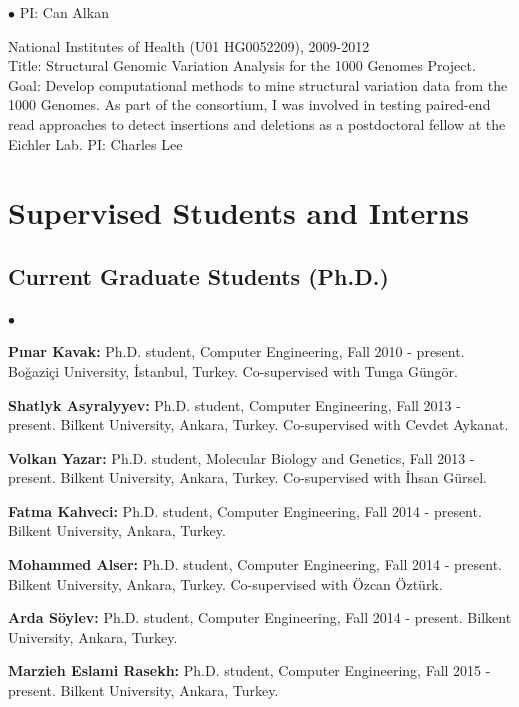 \documentclass[margin,line]{res}
\newenvironment{list2}{
  \begin{list}{$\bullet$}{%
      \setlength{\itemsep}{0in}
      \setlength{\parsep}{0in} \setlength{\parskip}{0in}
      \setlength{\topsep}{0in} \setlength{\partopsep}{0in} 
      \setlength{\leftmargin}{0.2in}}}{\end{list}}
\begin{document}
\begin{resume}
\begin{list2}
                                         PI: Can Alkan
                                       \item
                                         National Institutes of Health (U01 HG0052209), 2009-2012\\
                                         Title: Structural Genomic Variation Analysis for the 1000 Genomes Project.\\
                                         Goal: Develop computational methods to mine structural variation data from the 1000 Genomes.
                                         As part of the consortium, I was involved in testing paired-end read approaches to detect insertions and deletions as a postdoctoral fellow at the Eichler Lab.
                                         PI: Charles Lee
                                       \end{list2}


\section{\sc Supervised Students and Interns}
\vspace*{-.4cm}
\subsection{\small \sc Current Graduate Students (Ph.D.)}
\begin{list2}
\item
  {\bf P{\i}nar Kavak:} Ph.D. student, Computer Engineering, Fall 2010 - present.
  Bo\u{g}azi\c{c}i University, \.{I}stanbul, Turkey. Co-supervised with Tunga G\"{u}ng\"{o}r.
\item
  {\bf Shatlyk Asyralyyev:} Ph.D. student, Computer Engineering, Fall 2013 - present.
  Bilkent University, Ankara, Turkey. Co-supervised with Cevdet Aykanat.
\item
  {\bf Volkan Yazar:} Ph.D. student, Molecular Biology and Genetics, Fall 2013 - present.
  Bilkent University, Ankara, Turkey. Co-supervised with İhsan Gürsel.
\item
  {\bf Fatma Kahveci:} Ph.D. student, Computer Engineering, Fall 2014 - present.
  Bilkent University, Ankara, Turkey.
\item
  {\bf Mohammed Alser:} Ph.D. student, Computer Engineering, Fall 2014 - present.
  Bilkent University, Ankara, Turkey. Co-supervised with Özcan Öztürk.
\item
  {\bf Arda Söylev:} Ph.D. student, Computer Engineering, Fall 2014 - present.
  Bilkent University, Ankara, Turkey. 
\item
  {\bf Marzieh Eslami Rasekh:} Ph.D. student, Computer Engineering, Fall 2015 - present.
  Bilkent University, Ankara, Turkey. 
\end{list2}
\vspace*{-.4cm}

\end{resume}
\end{document}
